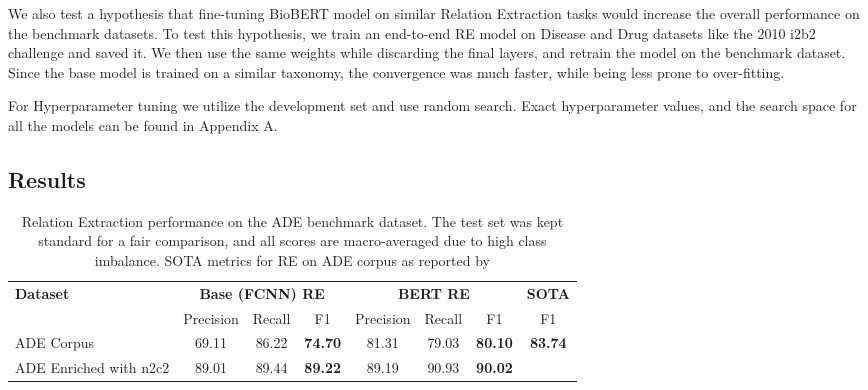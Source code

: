 \documentclass[letterpaper]{article}
\begin{document}
\begin{itemize}
    We also test a hypothesis that fine-tuning BioBERT model on similar Relation Extraction tasks would increase the overall performance on the benchmark datasets. To test this hypothesis, we train an end-to-end RE model on Disease and Drug datasets like the 2010 i2b2 challenge \cite{uzuner20112010} and saved it. We then use the same weights while discarding the final layers, and retrain the model on the benchmark dataset. Since the base model is trained on a similar taxonomy, the convergence was much faster, while being less prone to over-fitting.
    
     For Hyperparameter tuning we utilize the development set and use random search. Exact hyperparameter values, and the search space for all the models can be found in Appendix A.
    
\end{itemize}

\subsection{Results}

\begin{table*}
\centering
\begin{tabular}{lccccccc}
\toprule
\multirow{2}{*}{\textbf{Dataset}} &\multicolumn{3}{c}{\textbf{Base (FCNN) RE}} &\multicolumn{3}{c}{\textbf{BERT RE}} & \textbf{SOTA}\\
 & Precision & Recall & F1 & Precision & Recall & F1 & F1\\
\midrule
ADE Corpus & 69.11 & 86.22 & \textbf{74.70} & 81.31 & 79.03 & \textbf{80.10} & \textbf{83.74} \\
ADE Enriched with n2c2 & 89.01 & 89.44 & \textbf{89.22} & 89.19 & 90.93 & \textbf{90.02} & \\
\bottomrule
\end{tabular}
\caption{Relation Extraction performance on the ADE benchmark dataset. The test set was kept standard for a fair comparison, and all scores are macro-averaged due to high class imbalance. SOTA metrics for RE on ADE corpus as reported by \cite{DBLP:journals/corr/abs-2002-06424}}
\label{tab:re_metrics}
\end{table*}
\end{document}
